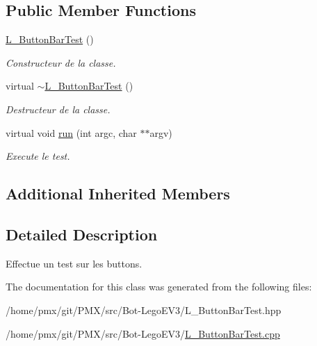 \subsection*{Public Member Functions}
\begin{DoxyCompactItemize}
\item 
\mbox{\label{classL__ButtonBarTest_a4618e9e6a92521434483c7d45d4d8c3a}} 
\hyperlink{classL__ButtonBarTest_a4618e9e6a92521434483c7d45d4d8c3a}{L\+\_\+\+Button\+Bar\+Test} ()
\begin{DoxyCompactList}\small\item\em Constructeur de la classe. \end{DoxyCompactList}\item 
\mbox{\label{classL__ButtonBarTest_ad127cad8d6701b4f413c35a6a885d305}} 
virtual \hyperlink{classL__ButtonBarTest_ad127cad8d6701b4f413c35a6a885d305}{$\sim$\+L\+\_\+\+Button\+Bar\+Test} ()
\begin{DoxyCompactList}\small\item\em Destructeur de la classe. \end{DoxyCompactList}\item 
\mbox{\label{classL__ButtonBarTest_a8b9670eb86f11aab09cb80040b856b45}} 
virtual void \hyperlink{classL__ButtonBarTest_a8b9670eb86f11aab09cb80040b856b45}{run} (int argc, char $\ast$$\ast$argv)
\begin{DoxyCompactList}\small\item\em Execute le test. \end{DoxyCompactList}\end{DoxyCompactItemize}
\subsection*{Additional Inherited Members}


\subsection{Detailed Description}
Effectue un test sur les buttons. 

The documentation for this class was generated from the following files\+:\begin{DoxyCompactItemize}
\item 
/home/pmx/git/\+P\+M\+X/src/\+Bot-\/\+Lego\+E\+V3/L\+\_\+\+Button\+Bar\+Test.\+hpp\item 
/home/pmx/git/\+P\+M\+X/src/\+Bot-\/\+Lego\+E\+V3/\hyperlink{L__ButtonBarTest_8cpp}{L\+\_\+\+Button\+Bar\+Test.\+cpp}\end{DoxyCompactItemize}
